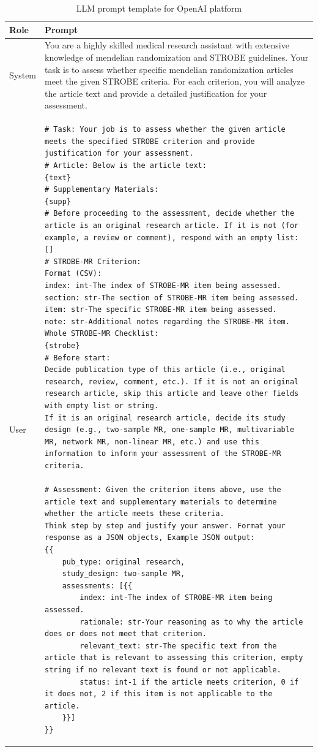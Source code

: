 \begin{table}
    \caption{LLM prompt template for OpenAI platform}
    \label{tab:prompt:openai}
    \begin{tabular}{lp{12cm}}
    \hline
    Role & Prompt \\
    \hline
    System &
    You are a highly skilled medical research assistant with extensive knowledge of mendelian randomization and STROBE guidelines.  Your task is to assess whether specific mendelian randomization articles meet the given STROBE criteria. For each criterion, you will analyze the article text and provide a detailed justification for your assessment. \\
    User & 
\begin{lstlisting}
# Task: Your job is to assess whether the given article meets the specified STROBE criterion and provide justification for your assessment.   
# Article: Below is the article text:  
{text} 
# Supplementary Materials: 
{supp}  
# Before proceeding to the assessment, decide whether the article is an original research article. If it is not (for example, a review or comment), respond with an empty list: [] 
# STROBE-MR Criterion:  
Format (CSV): 
index: int-The index of STROBE-MR item being assessed. 
section: str-The section of STROBE-MR item being assessed. 
item: str-The specific STROBE-MR item being assessed. 
note: str-Additional notes regarding the STROBE-MR item. 
Whole STROBE-MR Checklist: 
{strobe} 
# Before start:
Decide publication type of this article (i.e., original research, review, comment, etc.). If it is not an original research article, skip this article and leave other fields with empty list or string.
If it is an original research article, decide its study design (e.g., two-sample MR, one-sample MR, multivariable MR, network MR, non-linear MR, etc.) and use this information to inform your assessment of the STROBE-MR criteria.

# Assessment: Given the criterion items above, use the article text and supplementary materials to determine whether the article meets these criteria.
Think step by step and justify your answer. Format your response as a JSON objects, Example JSON output:
{{
    pub_type: original research,
    study_design: two-sample MR,
    assessments: [{{ 
        index: int-The index of STROBE-MR item being assessed.
        rationale: str-Your reasoning as to why the article does or does not meet that criterion.
        relevant_text: str-The specific text from the article that is relevant to assessing this criterion, empty string if no relevant text is found or not applicable.
        status: int-1 if the article meets criterion, 0 if it does not, 2 if this item is not applicable to the article.
    }}]
}}
\end{lstlisting}
\\
    \hline
    \end{tabular}
\end{table}



